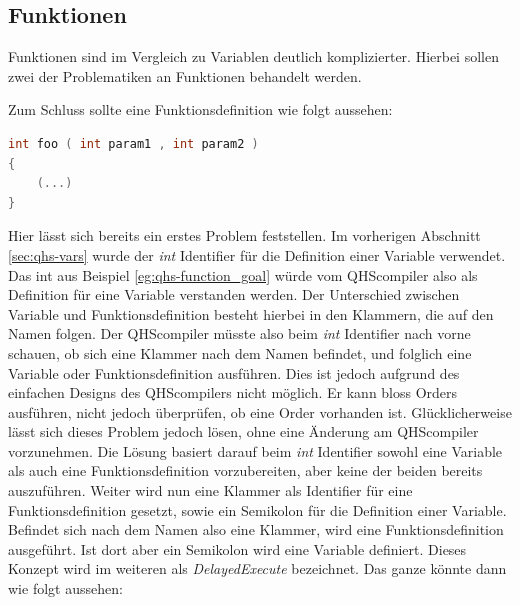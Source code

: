 \subsection{Funktionen} \label{sec:qhs-funcs}
Funktionen sind im Vergleich zu Variablen deutlich komplizierter. Hierbei sollen zwei der Problematiken an Funktionen behandelt werden.

Zum Schluss sollte eine Funktionsdefinition wie folgt aussehen:


\begin{lstlisting}[language=C, label=eg:qhs-function_goal, caption=Ziel für die Definition einer Funktion in QHS]
int foo ( int param1 , int param2 )
{
    (...)
}
\end{lstlisting}

Hier lässt sich bereits ein erstes Problem feststellen. Im vorherigen Abschnitt \ref{sec:qhs-vars} wurde der \textit{int} Identifier für die Definition einer Variable verwendet. 
Das int aus Beispiel \ref{eg:qhs-function_goal} würde vom QHScompiler also als Definition für eine Variable verstanden werden. Der Unterschied zwischen Variable und Funktionsdefinition besteht hierbei in den Klammern,
die auf den Namen folgen. Der QHScompiler müsste also beim \textit{int} Identifier nach vorne schauen, ob sich eine Klammer nach dem Namen befindet, und folglich eine Variable oder Funktionsdefinition ausführen.
Dies ist jedoch aufgrund des einfachen Designs des QHScompilers nicht möglich. Er kann bloss Orders ausführen, nicht jedoch überprüfen, ob eine Order vorhanden ist. Glücklicherweise lässt sich dieses Problem jedoch lösen,
ohne eine Änderung am QHScompiler vorzunehmen. Die Lösung basiert darauf beim \textit{int} Identifier sowohl eine Variable als auch eine Funktionsdefinition vorzubereiten, aber keine der beiden bereits auszuführen.
Weiter wird nun eine Klammer als Identifier für eine Funktionsdefinition gesetzt, sowie ein Semikolon für die Definition einer Variable. Befindet sich nach dem Namen also eine Klammer, wird eine Funktionsdefinition ausgeführt.
Ist dort aber ein Semikolon wird eine Variable definiert. Dieses Konzept wird im weiteren als \textit{DelayedExecute} bezeichnet. Das ganze könnte dann wie folgt aussehen:

